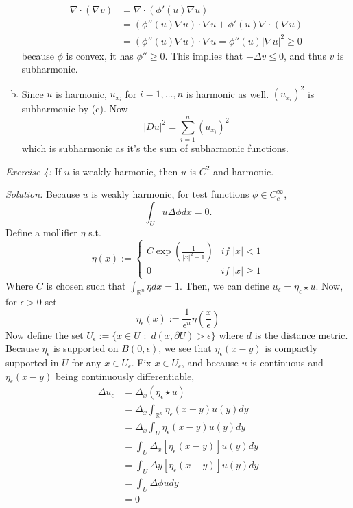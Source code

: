 \documentclass{article}
\newcommand{\exercise}[2]{
\vspace{0.2in}\begin{mdframed}[
  backgroundcolor=problem,
  skipabove=\topsep,
  skipbelow=\topsep
  ]
  \emph{Exercise {#1}:} {#2}
\end{mdframed}}
\newcommand{\R}{\mathbb{R}}
\begin{document}
\begin{enumerate}[(a)]
\begin{align*}
      \nabla\cdot (\nabla v) &= \nabla\cdot(\phi'(u)\nabla u) \\
      &= (\phi''(u)\nabla u)\cdot\nabla u + \phi'(u)\nabla\cdot(\nabla u) \\
      &= (\phi''(u)\nabla u)\cdot\nabla u = \phi''(u)|\nabla u|^2\ge 0
    \end{align*}
    because $\phi$ is convex, it has $\phi'' \ge 0$. This implies that $-\Delta v \le 0$, and thus $v$ is subharmonic.
    \item Since $u$ is harmonic, $u_{x_i}$ for $i=1,\dots,n$ is harmonic as well. $(u_{x_i})^2$ is subharmonic by (c). Now 
     \[|Du|^2 = \sum_{i=1}^n (u_{x_i})^2\]
     which is subharmonic as it's the sum of subharmonic functions.
    \end{enumerate}

    \exercise{4}{If $u$ is weakly harmonic, then $u$ is $C^2$ and harmonic.}
    \textit{Solution:} Because $u$ is weakly harmonic, for test functions $\phi\in C^\infty_c$,
    \[\int_{U}u\Delta\phi dx = 0.\]
    Define a mollifier $\eta$ s.t. 
    \[\eta(x) :=\begin{cases}
    C\exp{\left(\frac{1}{|x|^2-1}\right)} &\mathit{if}\,\,|x|<1 \\
    0 &\mathit{if}\,\, |x|\ge 1
    \end{cases}\]
    Where $C$ is chosen such that $\int_{\R^n}\eta dx = 1$. Then, we can define $u_\epsilon = \eta_\epsilon \star u$. Now, for $\epsilon > 0$ set
    \[\eta_\epsilon(x) := \frac{1}{\epsilon^n}\eta\left(\frac{x}{\epsilon}\right)\]
    Now define the set $U_\epsilon := \{x\in U\,\,:\,\,d(x,\partial U) > \epsilon\}$ where $d$ is the distance metric.
    Because $\eta_\epsilon$ is supported on $B(0,\epsilon)$, we see that $\eta_\epsilon(x-y)$ is compactly supported in $U$ for any $x\in U_\epsilon$.\newline
    Fix $x \in U_\epsilon$, and because $u$ is continuous and $\eta_{\epsilon}(x-y)$ being continuously differentiable,
    \begin{align*}
      \Delta u_\epsilon &= \Delta_x (\eta_\epsilon \star u)\\
      &= \Delta_x \int_{\R^n}\eta_\epsilon(x-y)u(y)dy \\
      &= \Delta_x \int_{U} \eta_{\epsilon}(x-y)u(y)dy \\
      &= \int_U\Delta_x \left[\eta_\epsilon(x-y)\right]u(y)dy \\
      &= \int_U\Delta y \left[\eta_\epsilon(x-y)\right]u(y)dy \\
      &= \int_U\Delta \phi udy \\
      &= 0
    \end{align*}
\end{document}
